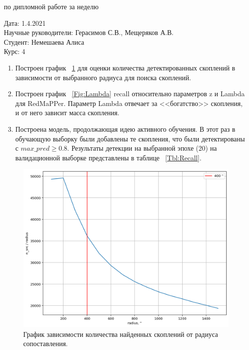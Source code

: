 \documentclass{article}
\begin{document}
\begin{center}{ по дипломной работе за неделю\\}\end{center}
Дата: 1.4.2021\\
Научные руководители: Герасимов С.В., Мещеряков А.В.\\
Студент: Немешаева Алиса\\
Курс: 4\\

\renewcommand{\labelitemi}{$\blacksquare$}
\renewcommand\labelitemii{$\square$}
\begin{enumerate}
    \item Построен график ~\ref{Fig:N_src}{} для оценки количества детектированных скоплений в 
        зависимости от выбранного радиуса для поиска скоплений.\\
    \item Построен график ~\ref{Fig:Lambda} recall относительно параметров z и Lambda для 
        RedMaPPer. Параметр Lambda отвечает за <<богатство>> скопления, и от него зависит масса 
        скопления.\\
    \item Построена модель, продолжающая идею активного обучения. В этот раз в обучающую выборку 
        были добавлены те скопления, что были детектированы с $max\_pred \geqslant 0.8$. Результаты
        детекции на выбранной эпохе (20) на валидационной выборке представлены в таблице
        ~\ref{Tbl:Recall}.\\
\end{enumerate}




\begin{figure}[h]
\includegraphics[width=0.8\linewidth]{n_src_rad}
\caption{График зависимости количества найденных скоплений от радиуса сопоставления.}
\label{Fig:N_src}
\end{figure}
\end{document}
